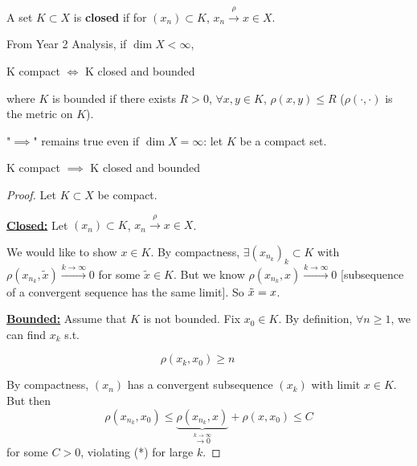 \documentclass{article}
\begin{document}
\begin{definition}[Closed]\nextline
    A set $K \subset X$ is \textbf{closed} if for $(x_n) \subset K$, $x_n \overset{\rho}{\longrightarrow} x \in X$.
\end{definition}


\begin{remark}
    From Year 2 Analysis, if $\dim X < \infty$,  
    \begin{center}
        K compact $\iff$ K closed and bounded
    \end{center}
    where $K$ is bounded if there exists $R>0$, $\forall x,y \in K$, $\rho(x,y) \leq R$ ($\rho(\cdot, \cdot)$ is the metric on $K$). 
\end{remark}  

\begin{remark}
    "$\implies$" remains true even if $\dim X = \infty$: let $K$ be a compact set.
\end{remark}

\begin{proposition}
\label{comapct implies ...}
    K compact $\implies$ K closed and bounded
\end{proposition}
\begin{proof}
Let $K\subset X$ be compact.  

\underline{\textbf{Closed:}}\nextline  
Let $(x_n) \subset K$, $x_n \overset{\rho}{\longrightarrow} x \in X$.  

We would like to show $x \in K$. By compactness, $\exists (x_{n_k})_k \subset K$ with $\rho(x_{n_k}, \tilde{x}) \overset{k\to \infty}{\longrightarrow} 0$ for some $\tilde{x} \in K$. But we know $\rho(x_{n_k}, x)\overset{k\to \infty}{\longrightarrow} 0$ [subsequence of a convergent sequence has the same limit]. So $\Tilde{x}=x$. 

\underline{\textbf{Bounded:}}\nextline
Assume that $K$ is not bounded. Fix $x_0 \in K$. By definition, $\forall n \geq 1$, we can find $x_k$ s.t. 

\begin{equation*}
\rho(x_k, x_0) \geq n \qquad 
\tag{*}
\end{equation*}


By compactness, $(x_n)$ has a convergent subsequence $(x_k)$ with limit $x \in K$. But then 
$$
\rho(x_{n_k}, x_0) \leq \underbrace{\rho(x_{n_k}, x)}_{\overset{k \to \infty}{\longrightarrow 0}} + \rho(x, x_0) \leq C
$$
for some $C>0$, violating (*) for large $k$.
\end{proof}
\end{document}
